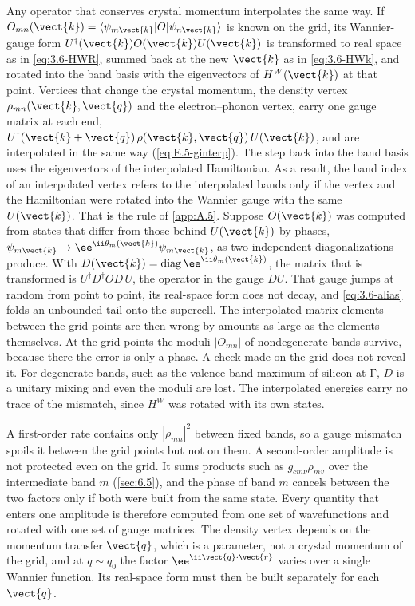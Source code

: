 Any operator that conserves crystal momentum interpolates the same way. If $O_{mn}(\vect{k}) = \langle\psi_{m\vect{k}}|O|\psi_{n\vect{k}}\rangle$ is known on the grid, its Wannier-gauge form $U^\dagger(\vect{k})O(\vect{k})U(\vect{k})$ is transformed to real space as in \cref{eq:3.6-HWR}, summed back at the new $\vect{k}$ as in \cref{eq:3.6-HWk}, and rotated into the band basis with the eigenvectors of $H^W(\vect{k})$ at that point. Vertices that change the crystal momentum, the density vertex $\rho_{mn}(\vect{k},\vect{q})$ and the electron--phonon vertex, carry one gauge matrix at each end, $U^\dagger(\vect{k} + \vect{q})\,\rho(\vect{k},\vect{q})\,U(\vect{k})$, and are interpolated in the same way (\cref{eq:E.5-ginterp}). The step back into the band basis uses the eigenvectors of the interpolated Hamiltonian. As a result, the band index of an interpolated vertex refers to the interpolated bands only if the vertex and the Hamiltonian were rotated into the Wannier gauge with the same $U(\vect{k})$. That is the rule of \cref{app:A.5}. Suppose $O(\vect{k})$ was computed from states that differ from those behind $U(\vect{k})$ by phases, $\psi_{m\vect{k}} \to \ee^{\ii\theta_m(\vect{k})}\psi_{m\vect{k}}$, as two independent diagonalizations produce. With $D(\vect{k}) = \mathrm{diag}\,\ee^{\ii\theta_m(\vect{k})}$, the matrix that is transformed is $U^\dagger D^\dagger OD\,U$, the operator in the gauge $DU$. That gauge jumps at random from point to point, its real-space form does not decay, and \cref{eq:3.6-alias} folds an unbounded tail onto the supercell. The interpolated matrix elements between the grid points are then wrong by amounts as large as the elements themselves. At the grid points the moduli $|O_{mn}|$ of nondegenerate bands survive, because there the error is only a phase. A check made on the grid does not reveal it. For degenerate bands, such as the valence-band maximum of silicon at $\mathrm{\Gamma}$, $D$ is a unitary mixing and even the moduli are lost. The interpolated energies carry no trace of the mismatch, since $H^W$ was rotated with its own states.

A first-order rate contains only $|\rho_{mn}|^2$ between fixed bands, so a gauge mismatch spoils it between the grid points but not on them. A second-order amplitude is not protected even on the grid. It sums products such as $g_{cm\nu}\rho_{mv}$ over the intermediate band $m$ (\cref{sec:6.5}), and the phase of band $m$ cancels between the two factors only if both were built from the same state. Every quantity that enters one amplitude is therefore computed from one set of wavefunctions and rotated with one set of gauge matrices. The density vertex depends on the momentum transfer $\vect{q}$, which is a parameter, not a crystal momentum of the grid, and at $q \sim q_0$ the factor $\ee^{\ii\vect{q}\cdot\vect{r}}$ varies over a single Wannier function. Its real-space form must then be built separately for each $\vect{q}$.

